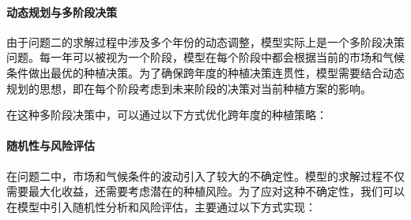 \documentclass[12pt,a4paper]{nmmcm}
\begin{document}
\paragraph{动态规划与多阶段决策}

由于问题二的求解过程中涉及多个年份的动态调整，模型实际上是一个多阶段决策问题。每一年可以被视为一个阶段，模型在每个阶段中都会根据当前的市场和气候条件做出最优的种植决策。为了确保跨年度的种植决策连贯性，模型需要结合动态规划的思想，即在每个阶段考虑到未来阶段的决策对当前种植方案的影响。

在这种多阶段决策中，可以通过以下方式优化跨年度的种植策略：





\paragraph{随机性与风险评估}

在问题二中，市场和气候条件的波动引入了较大的不确定性。模型的求解过程不仅需要最大化收益，还需要考虑潜在的种植风险。为了应对这种不确定性，我们可以在模型中引入随机性分析和风险评估，主要通过以下方式实现：
\end{document}
